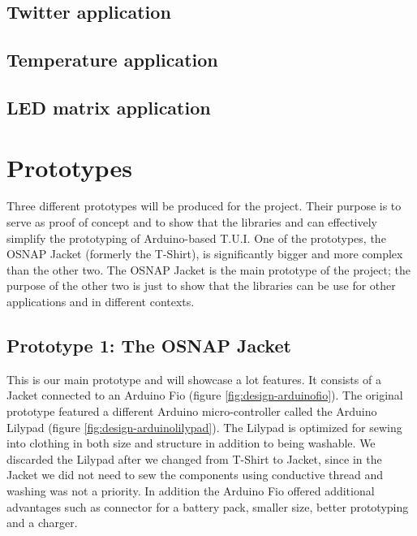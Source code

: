 \subsection{Twitter application}
\subsection{Temperature application}
\subsection{LED matrix application}


\section{Prototypes}
\label{sec:prototypes}
Three different prototypes will be produced for the project. Their purpose is to serve as proof of concept and
to show that the libraries and can effectively simplify the prototyping of Arduino-based T.U.I.
One of the prototypes, the OSNAP Jacket (formerly the T-Shirt), is significantly bigger and more complex than the other two.
The OSNAP Jacket is the main prototype of the project; the purpose of the other two
is just to show that the libraries can be use for other applications and in different contexts.

\subsection{Prototype 1: The OSNAP Jacket}
This is our main prototype and will showcase a lot features.
It consists of a Jacket connected to an Arduino Fio (figure \ref{fig:design-arduinofio}). The original prototype featured a different
Arduino micro-controller called the Arduino Lilypad (figure \ref{fig:design-arduinolilypad}). The Lilypad is optimized for sewing into 
clothing in both size and structure in addition to being washable. We discarded the Lilypad after we changed from T-Shirt to Jacket,
since in the Jacket we did not need to sew the components using conductive thread and washing was not a priority. In addition the 
Arduino Fio offered additional advantages such as connector for a battery pack, smaller size, better prototyping and a charger.

